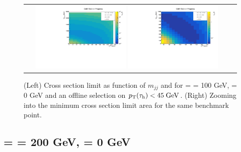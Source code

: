 \begin{figure}[tbh!]
	\centering
	\begin{tabular}{cc}
		\includegraphics[width=0.45\textwidth]{analysis/pics/JetInvMass_vs_MET_xsec_chi100_lsp000_taupt45.pdf}
		\includegraphics[width=0.45\textwidth]{analysis/pics/JetInvMass_vs_MET_xsec_chi100_lsp000_taupt45_zoom.pdf} 		
	\end{tabular}
	\caption{(Left) Cross section limit as function of $m_{jj}$ and \met for \charginopm = \neutralinotwo = 100 GeV, \neutralinoone = 0 GeV and an offline selection on $p_{\text{T}}(\tau_{\text{h}}) <  45\;\text{Ge}\kern-0.06667em\text{V}$. (Right) Zooming into the minimum cross section limit area for the same benchmark point.}
	\label{fig::JetInvMass_vs_MET_xsec_chi100_lsp000_taupt45}
\end{figure}

\FloatBarrier

\subsection*{\charginopm = \neutralinotwo = 200 GeV, \neutralinoone = 0 GeV}

\FloatBarrier

